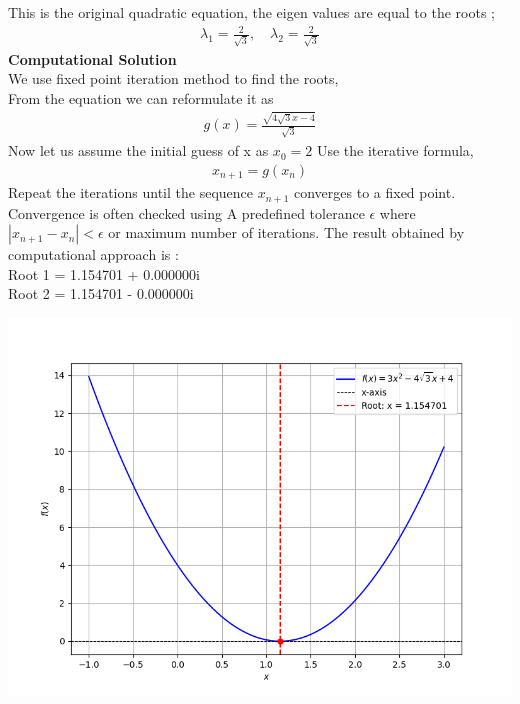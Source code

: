 \documentclass[journal]{IEEEtran}
\begin{document}
This is the original quadratic equation, the eigen values are equal to the roots ;
\begin{align}
    \lambda_1 = \frac{2}{\sqrt{3}}, \quad \lambda_2 = \frac{2}{\sqrt{3}}
\end{align}
\textbf{Computational Solution}\\
We use fixed point iteration method to find the roots,\\
From the equation we can reformulate it as \\
\begin{align}
    g(x)=\frac{\sqrt{4{\sqrt{3}}x-4}}{\sqrt{3}}
\end{align}
Now let us assume the initial guess of x as $x_0=2$
Use the iterative formula,
\begin{align}
    x_{n+1}=g(x_n)
\end{align}
 Repeat the iterations until the sequence ${x_{n+1}}$ converges to a fixed point.
 Convergence is often checked using
A predefined tolerance $\epsilon$ where $|x_{n+1}-x_n|<\epsilon$ or maximum number of iterations.
The result obtained by computational approach is :\\
Root 1 = 1.154701 + 0.000000i\\
Root 2 = 1.154701 - 0.000000i
\begin{center}
    \includegraphics[width=0.75\columnwidth]{figs/eq.png}
\end{center}
\end{document}
